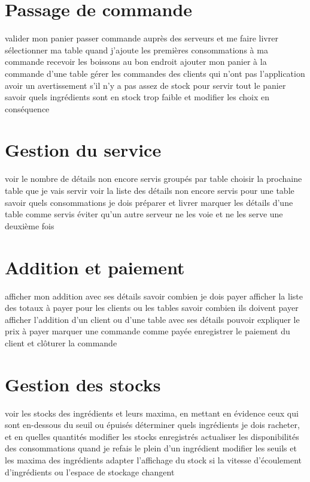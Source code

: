 \documentclass[a4paper,10pt]{article}
\begin{document}
\section{Passage de commande}

{valider mon panier}
{passer commande auprès des serveurs et me faire livrer}
{sélectionner ma table quand j'ajoute les premières consommations à ma commande}
{recevoir les boissons au bon endroit}
{ajouter mon panier à la commande d'une table}
{gérer les commandes des clients qui n'ont pas l'application}
{avoir un avertissement s'il n'y a pas assez de stock pour servir tout le panier}
{savoir quels ingrédients sont en stock trop faible et modifier les choix en conséquence}

\section{Gestion du service}

{voir le nombre de détails non encore servis groupés par table}
{choisir la prochaine table que je vais servir}
{voir la liste des détails non encore servis pour une table}
{savoir quels consommations je dois préparer et livrer}
{marquer les détails d'une table comme servis}
{éviter qu'un autre serveur ne les voie et ne les serve une deuxième fois}

\section{Addition et paiement}

{afficher mon addition avec ses détails}
{savoir combien je dois payer}
{afficher la liste des totaux à payer pour les clients ou les tables}
{savoir combien ils doivent payer}
{afficher l'addition d'un client ou d'une table avec ses détails}
{pouvoir expliquer le prix à payer}
{marquer une commande comme payée}
{enregistrer le paiement du client et clôturer la commande}

\section{Gestion des stocks}

{voir les stocks des ingrédients et leurs maxima, en mettant en évidence ceux qui sont en-dessous du seuil ou épuisés}
{déterminer quels ingrédients je dois racheter, et en quelles quantités}
{modifier les stocks enregistrés}
{actualiser les disponibilités des consommations quand je refais le plein d'un ingrédient}
{modifier les seuils et les maxima des ingrédients}
{adapter l'affichage du stock si la vitesse d'écoulement d'ingrédients ou l'espace de stockage changent}
\end{document}
